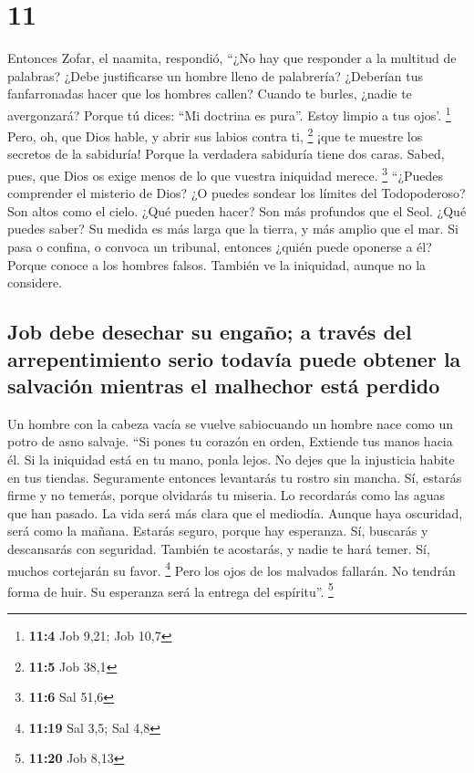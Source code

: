 \hypertarget{section-10}{%
\section{11}\label{section-10}}

 Entonces Zofar, el naamita, respondió, 
``¿No hay que responder a la multitud de palabras? ¿Debe justificarse un
hombre lleno de palabrería?  ¿Deberían tus fanfarronadas
hacer que los hombres callen? Cuando te burles, ¿nadie te avergonzará?
 Porque tú dices: ``Mi doctrina es pura''. Estoy limpio a
tus ojos'. \footnote{\textbf{11:4} Job 9,21; Job 10,7} 
Pero, oh, que Dios hable, y abrir sus labios contra ti, \footnote{\textbf{11:5}
  Job 38,1}  ¡que te muestre los secretos de la sabiduría!
Porque la verdadera sabiduría tiene dos caras. Sabed, pues, que Dios os
exige menos de lo que vuestra iniquidad merece. \footnote{\textbf{11:6}
  Sal 51,6}  ``¿Puedes comprender el misterio de Dios? ¿O
puedes sondear los límites del Todopoderoso?  Son altos
como el cielo. ¿Qué pueden hacer? Son más profundos que el Seol. ¿Qué
puedes saber?  Su medida es más larga que la tierra, y más
amplio que el mar.  Si pasa o confina, o convoca un
tribunal, entonces ¿quién puede oponerse a él?  Porque
conoce a los hombres falsos. También ve la iniquidad, aunque no la
considere.

\hypertarget{job-debe-desechar-su-engauxf1o-a-travuxe9s-del-arrepentimiento-serio-todavuxeda-puede-obtener-la-salvaciuxf3n-mientras-el-malhechor-estuxe1-perdido}{%
\subsection{Job debe desechar su engaño; a través del arrepentimiento
serio todavía puede obtener la salvación mientras el malhechor está
perdido}\label{job-debe-desechar-su-engauxf1o-a-travuxe9s-del-arrepentimiento-serio-todavuxeda-puede-obtener-la-salvaciuxf3n-mientras-el-malhechor-estuxe1-perdido}}

 Un hombre con la cabeza vacía se vuelve sabiocuando un
hombre nace como un potro de asno salvaje.  ``Si pones tu
corazón en orden, Extiende tus manos hacia él.  Si la
iniquidad está en tu mano, ponla lejos. No dejes que la injusticia
habite en tus tiendas.  Seguramente entonces levantarás
tu rostro sin mancha. Sí, estarás firme y no temerás, 
porque olvidarás tu miseria. Lo recordarás como las aguas que han
pasado.  La vida será más clara que el mediodía. Aunque
haya oscuridad, será como la mañana.  Estarás seguro,
porque hay esperanza. Sí, buscarás y descansarás con seguridad.
 También te acostarás, y nadie te hará temer. Sí, muchos
cortejarán su favor. \footnote{\textbf{11:19} Sal 3,5; Sal 4,8}
 Pero los ojos de los malvados fallarán. No tendrán forma
de huir. Su esperanza será la entrega del espíritu''. \footnote{\textbf{11:20}
  Job 8,13}

